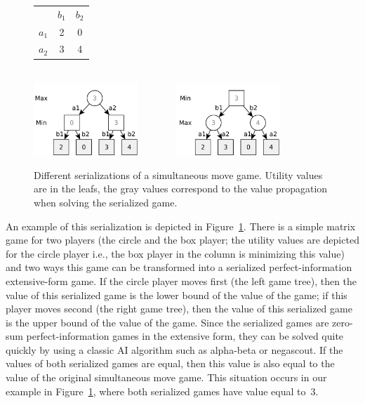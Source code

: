 \begin{figure}
\centering
\begin{tabular}{l|c|c|}
 \multicolumn{1}{c}{~} & \multicolumn{1}{c}{$b_1$}  &  \multicolumn{1}{c}{$b_2$}\\\cline{2-3}
$a_1$ &  2  &  0\\\cline{2-3}
$a_2$ &  3  &  4\\\cline{2-3}
\end{tabular}
\\\vspace{0.5cm}
\includegraphics[width=0.35\textwidth]{figures/serialization1.pdf}~~~~~~~
\includegraphics[width=0.35\textwidth]{figures/serialization2.pdf}
\caption{Different serializations of a simultaneous move game. Utility values are in the leafs, the gray values correspond to the value propagation when solving the serialized game.}\label{fig:serialization}
\end{figure}

An example of this serialization is depicted in Figure~\ref{fig:serialization}. 
There is a simple matrix game for two players (the circle and the box player; the utility values are depicted for the circle player i.e., the box player in the column is minimizing this value) and two ways this game can be transformed into a serialized perfect-information extensive-form game.
If the circle player moves first (the left game tree), then the value of this serialized game is the lower bound of the value of the game; if this player moves second (the right game tree), then the value of this serialized game is the upper bound of the value of the game.
Since the serialized games are zero-sum perfect-information games in the extensive form, they can be solved quite quickly by using a classic AI 
algorithm such as alpha-beta or negascout.
If the values of both serialized games are equal, then this value is also equal to the value of the original simultaneous move game. 
This situation occurs in our example in Figure~\ref{fig:serialization}, where both serialized games have value equal to~$3$.

